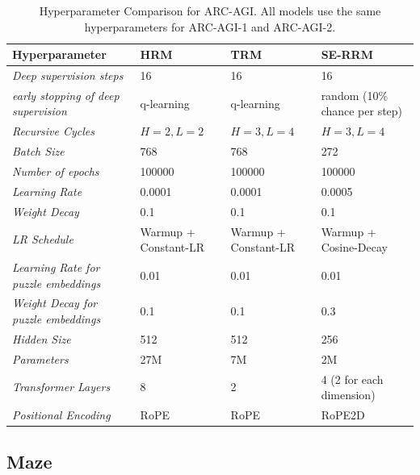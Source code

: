 \documentclass{article}
\theoremstyle{plain}
\theoremstyle{definition}
\theoremstyle{remark}
\begin{document}
\begin{table}[H]
\centering
\caption{Hyperparameter Comparison for ARC-AGI. All models use the same hyperparameters for ARC-AGI-1 and ARC-AGI-2.}

\label{tab:hyperparams_arc}
\begin{tabular}{@{}llll@{}}
\toprule
\textbf{Hyperparameter} & \textbf{HRM} & \textbf{TRM}  & \textbf{SE-RRM}\\ 

\midrule
\textit{Deep supervision steps} & 16 & 16  & 16 \\
\textit{early stopping of deep supervision} & q-learning & q-learning  & random (10\% chance per step) \\
\textit{Recursive Cycles} & $H=2, L=2$ & $H=3, L=4$  & $H=3, L=4$  \\
\textit{Batch Size} & 768 & 768  & 272 \\
\textit{Number of epochs} & 100000 & 100000  & 100000 \\
\textit{Learning Rate} & 0.0001 & 0.0001  & 0.0005 \\
\textit{Weight Decay} & 0.1 & 0.1 & 0.1 \\
\textit{LR Schedule} & Warmup + Constant-LR & Warmup + Constant-LR & Warmup + Cosine-Decay \\
\textit{Learning Rate for puzzle embeddings} & 0.01 & 0.01  & 0.01 \\
\textit{Weight Decay for puzzle embeddings} & 0.1 & 0.1  & 0.3 \\
\textit{Hidden Size} & 512 & 512 & 256 \\
\textit{Parameters} & 27M & 7M & 2M \\
\textit{Transformer Layers} & 8 & 2 & 4 (2 for each dimension) \\ 
\textit{Positional Encoding} & RoPE &RoPE & RoPE2D \\ 
\bottomrule
\end{tabular}
\end{table}

\subsection{Maze}
\end{document}
